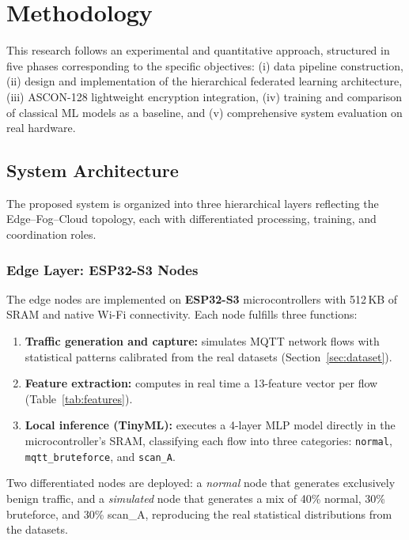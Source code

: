 \chapter{Methodology}
\label{chap:meth}

This research follows an experimental and quantitative approach, structured in five phases corresponding to the specific objectives: (i) data pipeline construction, (ii) design and implementation of the hierarchical federated learning architecture, (iii) ASCON-128 lightweight encryption integration, (iv) training and comparison of classical ML models as a baseline, and (v) comprehensive system evaluation on real hardware.

\section{System Architecture}
\label{sec:arquitectura}

The proposed system is organized into three hierarchical layers reflecting the Edge--Fog--Cloud topology, each with differentiated processing, training, and coordination roles.

\subsection{Edge Layer: ESP32-S3 Nodes}

The edge nodes are implemented on \textbf{ESP32-S3} microcontrollers with 512\,KB of SRAM and native Wi-Fi connectivity. Each node fulfills three functions:
\begin{enumerate}
    \item \textbf{Traffic generation and capture:} simulates MQTT network flows with statistical patterns calibrated from the real datasets (Section~\ref{sec:dataset}).
    \item \textbf{Feature extraction:} computes in real time a 13-feature vector per flow (Table~\ref{tab:features}).
    \item \textbf{Local inference (TinyML):} executes a 4-layer MLP model directly in the microcontroller's SRAM, classifying each flow into three categories: \texttt{normal}, \texttt{mqtt\_bruteforce}, and \texttt{scan\_A}.
\end{enumerate}

Two differentiated nodes are deployed: a \emph{normal} node that generates exclusively benign traffic, and a \emph{simulated} node that generates a mix of 40\% normal, 30\% bruteforce, and 30\% scan\_A, reproducing the real statistical distributions from the datasets.


